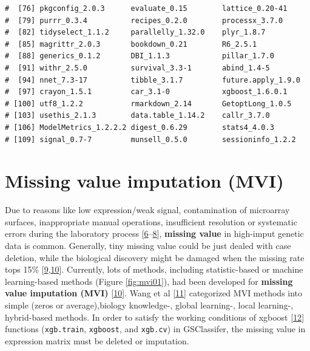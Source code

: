 \documentclass[
  12pt,
]{book}
\begin{document}
\begin{verbatim}
#  [76] pkgconfig_2.0.3      evaluate_0.15        lattice_0.20-41     
#  [79] purrr_0.3.4          recipes_0.2.0        processx_3.7.0      
#  [82] tidyselect_1.1.2     parallelly_1.32.0    plyr_1.8.7          
#  [85] magrittr_2.0.3       bookdown_0.21        R6_2.5.1            
#  [88] generics_0.1.2       DBI_1.1.3            pillar_1.7.0        
#  [91] withr_2.5.0          survival_3.3-1       abind_1.4-5         
#  [94] nnet_7.3-17          tibble_3.1.7         future.apply_1.9.0  
#  [97] crayon_1.5.1         car_3.1-0            xgboost_1.6.0.1     
# [100] utf8_1.2.2           rmarkdown_2.14       GetoptLong_1.0.5    
# [103] usethis_2.1.3        data.table_1.14.2    callr_3.7.0         
# [106] ModelMetrics_1.2.2.2 digest_0.6.29        stats4_4.0.3        
# [109] signal_0.7-7         munsell_0.5.0        sessioninfo_1.2.2
\end{verbatim}

\hypertarget{missing-value-imputation-mvi}{%
\section{Missing value imputation (MVI)}\label{missing-value-imputation-mvi}}

Due to reasons like low expression/weak signal, contamination of microarray surfaces, inappropriate manual operations, insufficient resolution or systematic errors during the laboratory process {[}\protect\hyperlink{ref-RN387}{6}--\protect\hyperlink{ref-RN382}{8}{]}, \textbf{missing value} in high-imput genetic data is common. Generally, tiny missing value could be just dealed with case deletion, while the biological discovery might be damaged when the missing rate tops 15\% {[}\protect\hyperlink{ref-RN392}{9},\protect\hyperlink{ref-RN386}{10}{]}. Currently, lots of methods, including statistic-based or machine learning-based methods (Figure \ref{fig:mvi01}), had been developed for \textbf{missing value imputation (MVI)} {[}\protect\hyperlink{ref-RN386}{10}{]}. Wang et al {[}\protect\hyperlink{ref-RN384}{11}{]} categorized MVI methods into simple (zeros or average),biology knowledge-, global learning-, local learning-, hybrid-based methods. In order to satisfy the working conditions of xgboost {[}\protect\hyperlink{ref-xgboost}{12}{]} functions (\texttt{xgb.train}, \texttt{xgboost}, and \texttt{xgb.cv}) in GSClassifer, the missing value in expression matrix must be deleted or imputation.
\end{document}
